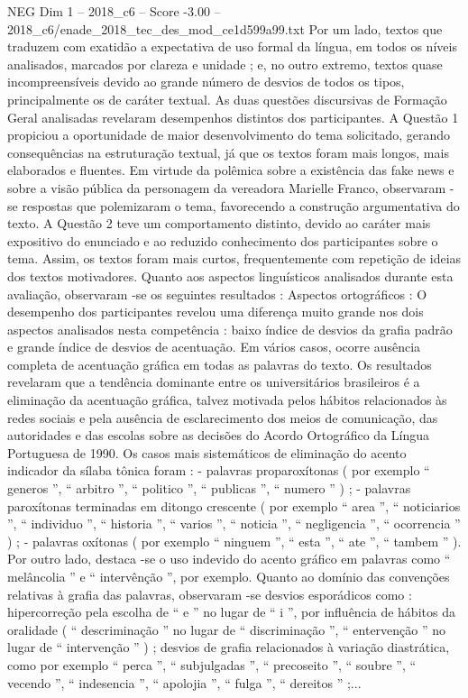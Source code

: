 \begin{textsample}{NEG Dim 1 – 2018\_c6 – Score -3.00 – 2018\_c6/enade\_2018\_tec\_des\_mod\_ce1d599a99.txt}
Por um lado, textos que traduzem com exatidão a expectativa de uso formal da língua, em todos os níveis analisados, marcados por clareza e unidade ; e, no outro extremo, textos quase incompreensíveis devido ao grande número de desvios de todos os tipos, principalmente os de caráter textual.
As duas questões discursivas de Formação Geral analisadas revelaram desempenhos distintos dos participantes.
A Questão 1 propiciou a oportunidade de maior desenvolvimento do tema solicitado, gerando consequências na estruturação textual, já que os textos foram mais longos, mais elaborados e fluentes.
Em virtude da polêmica sobre a existência das fake news e sobre a visão pública da personagem da vereadora Marielle Franco, observaram -se respostas que polemizaram o tema, favorecendo a construção argumentativa do texto.
A Questão 2 teve um comportamento distinto, devido ao caráter mais expositivo do enunciado e ao reduzido conhecimento dos participantes sobre o tema.
Assim, os textos foram mais curtos, frequentemente com repetição de ideias dos textos motivadores.
Quanto aos aspectos linguísticos analisados durante esta avaliação, observaram -se os seguintes resultados : Aspectos ortográficos : O desempenho dos participantes revelou uma diferença muito grande nos dois aspectos analisados nesta competência : baixo índice de desvios da grafia padrão e grande índice de desvios de acentuação.
Em vários casos, ocorre ausência completa de acentuação gráfica em todas as palavras do texto.
Os resultados revelaram que a tendência dominante entre os universitários brasileiros é a eliminação da acentuação gráfica, talvez motivada pelos hábitos relacionados às redes sociais e pela ausência de esclarecimento dos meios de comunicação, das autoridades e das escolas sobre as decisões do Acordo Ortográfico da Língua Portuguesa de 1990.
Os casos mais sistemáticos de eliminação do acento indicador da sílaba tônica foram : - palavras proparoxítonas ( por exemplo “ generos ”, “ arbitro ”, “ politico ”, “ publicas ”, “ numero ” ) ; - palavras paroxítonas terminadas em ditongo crescente ( por exemplo “ area ”, “ noticiarios ”, “ individuo ”, “ historia ”, “ varios ”, “ noticia ”, “ negligencia ”, “ ocorrencia ” ) ; - palavras oxítonas ( por exemplo “ ninguem ”, “ esta ”, “ ate ”, “ tambem ” ).
Por outro lado, destaca -se o uso indevido do acento gráfico em palavras como “ melâncolia ” e “ intervênção ”, por exemplo.
Quanto ao domínio das convenções relativas à grafia das palavras, observaram -se desvios esporádicos como : hipercorreção pela escolha de “ e ” no lugar de “ i ”, por influência de hábitos da oralidade ( “ descriminação ” no lugar de “ discriminação ”, “ entervenção ” no lugar de “ intervenção ” ) ; desvios de grafia relacionados à variação diastrática, como por exemplo “ perca ”, “ subjulgadas ”, “ precoseito ”, “ soubre ”, “ vecendo ”, “ indesencia ”, “ apolojia ”, “ fulga ”, “ dereitos ” ;...

\end{textsample}
